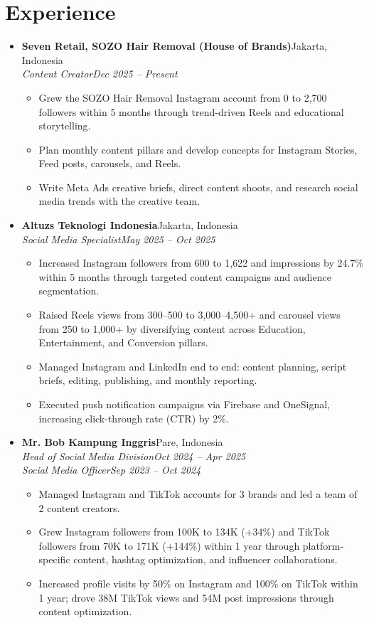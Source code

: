 \documentclass[10pt,letterpaper]{article}
\newcommand{\entry}[4]{\vspace{2pt}\item \textbf{#1}\hfill #2\\[-1pt] \textit{#3}\hfill \textit{#4}}
\newcommand{\role}[2]{\\[1pt] \textit{#1}\hfill \textit{#2}}
\begin{document}
\section{Experience}
\begin{itemize}
\entry{Seven Retail, SOZO Hair Removal (House of Brands)}{Jakarta, Indonesia}{Content Creator}{Dec 2025 -- Present}
\begin{itemize}
\item Grew the SOZO Hair Removal Instagram account from 0 to 2,700 followers within 5 months through trend-driven Reels and educational storytelling.
\item Plan monthly content pillars and develop concepts for Instagram Stories, Feed posts, carousels, and Reels.
\item Write Meta Ads creative briefs, direct content shoots, and research social media trends with the creative team.
\end{itemize}
\entry{Altuzs Teknologi Indonesia}{Jakarta, Indonesia}{Social Media Specialist}{May 2025 -- Oct 2025}
\begin{itemize}
\item Increased Instagram followers from 600 to 1,622 and impressions by 24.7\% within 5 months through targeted content campaigns and audience segmentation.
\item Raised Reels views from 300--500 to 3,000--4,500+ and carousel views from 250 to 1,000+ by diversifying content across Education, Entertainment, and Conversion pillars.
\item Managed Instagram and LinkedIn end to end: content planning, script briefs, editing, publishing, and monthly reporting.
\item Executed push notification campaigns via Firebase and OneSignal, increasing click-through rate (CTR) by 2\%.
\end{itemize}
\entry{Mr. Bob Kampung Inggris}{Pare, Indonesia}{Head of Social Media Division}{Oct 2024 -- Apr 2025}
\role{Social Media Officer}{Sep 2023 -- Oct 2024}
\begin{itemize}
\item Managed Instagram and TikTok accounts for 3 brands and led a team of 2 content creators.
\item Grew Instagram followers from 100K to 134K (+34\%) and TikTok followers from 70K to 171K (+144\%) within 1 year through platform-specific content, hashtag optimization, and influencer collaborations.
\item Increased profile visits by 50\% on Instagram and 100\% on TikTok within 1 year; drove 38M TikTok views and 54M post impressions through content optimization.

\end{itemize}
\end{itemize}
\end{document}
